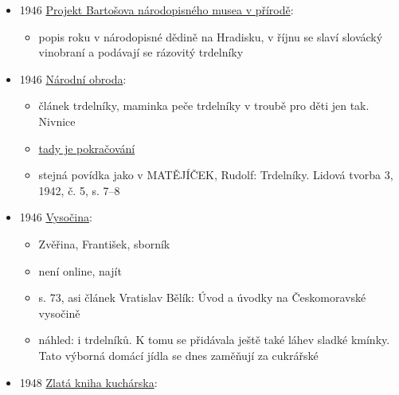\begin{itemize}
  \begin{itemize}
  \tightlist
  \item
    trdelník = dřevěný váleček na způsob rumpálu
  \item
    trdláč = zvláštní druh pečiva, těsto namotaný na trdelníku opečený
    nad ohněm a pomašťovaný
  \end{itemize}
\item
  1946
  \href{https://ceskadigitalniknihovna.cz/uuid/uuid:c22c5a5d-8140-11ed-b210-001b63bd97ba}{Projekt
  Bartošova národopisného musea v přírodě}:

  \begin{itemize}
  \tightlist
  \item
    popis roku v národopisné dědině na Hradisku, v říjnu se slaví
    slovácký vinobraní a podávají se rázovitý trdelníky
  \end{itemize}
\item
  1946
  \href{https://ceskadigitalniknihovna.cz/uuid/uuid:4b7ffab0-68c3-11e8-a583-005056827e51}{Národní
  obroda}:

  \begin{itemize}
  \tightlist
  \item
    článek trdelníky, maminka peče trdelníky v troubě pro děti jen tak.
    Nivnice
  \item
    \href{https://ceskadigitalniknihovna.cz/uuid/uuid:747b7700-68c3-11e8-943b-5ef3fc9ae867}{tady
    je pokračování}
  \item
    stejná povídka jako v MATĚJÍČEK, Rudolf: Trdelníky. Lidová tvorba 3,
    1942, č. 5, s. 7--8
  \end{itemize}
\item
  1946
  \href{https://www.digitalniknihovna.cz/kkvhb/uuid/uuid:17eac0fd-dbca-4820-a63f-65c6f4255006}{Vysočina}:

  \begin{itemize}
  \tightlist
  \item
    Zvěřina, František, sborník
  \item
    není online, najít
  \item
    s. 73, asi článek Vratislav Bělík: Úvod a úvodky na Českomoravské
    vysočině
  \item
    náhled: i trdelníků. K tomu se přidávala ještě také láhev sladké
    kmínky. Tato výborná domácí jídla se dnes zaměňují za cukrářské
  \end{itemize}
\item
  1948
  \href{https://dikda.snk.sk/uuid/uuid:92a95dfe-83fe-44e4-9c0a-5c7cec70c80c}{Zlatá
  kniha kuchárska}:


\end{itemize}
